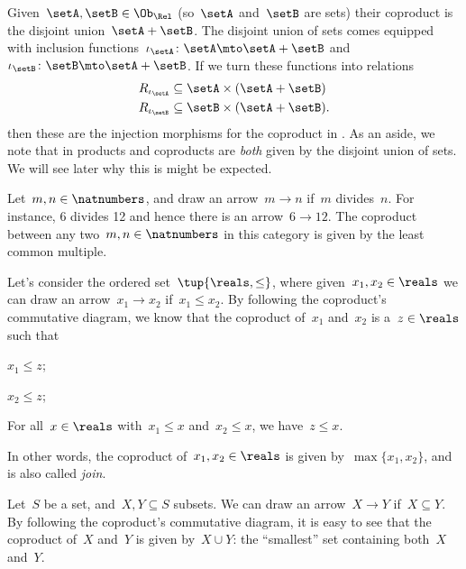 \begin{example}
  Given~$\setA,\setB\in \Ob_\Rel$ (so~$\setA$ and~$\setB$ are sets) their coproduct is the disjoint union~$\setA+\setB$.
  The disjoint union of sets comes equipped with inclusion functions~$\iota_\setA\colon \setA\mto \setA+\setB$ and~$\iota_\setB\colon \setB\mto \setA+\setB$.
  If we turn these functions into relations
  \begin{equation*}
    \begin{aligned}
      R_{\iota_\setA}&\subseteq \setA\times (\setA+\setB)\\
      R_{\iota_\setB}&\subseteq \setB\times (\setA+\setB).
    \end{aligned}
  \end{equation*}
  then these are the injection morphisms for the coproduct in \Rel.
  As an aside, we note that in \Rel products and coproducts are \emph{both} given by the disjoint union of sets.
  We will see later why this is might be expected.
\end{example}

\begin{example}
  Let~$m,n\in \natnumbers$, and draw an arrow~$m\to n$ if~$m$ divides~$n$. For instance, 6 divides 12 and hence there is an arrow~$6\to 12$. The coproduct between any two~$m,n\in \natnumbers$ in this category is given by the least common multiple.
\end{example}

\begin{example}
  Let's consider the ordered set~$\tup{\reals,\leq}$, where given~$x_1,x_2\in \reals$ we can draw an arrow~$x_1\to x_2$ if~$x_1\leq x_2$. By following the coproduct's commutative diagram, we know that the coproduct of~$x_1$ and~$x_2$ is a~$z\in \reals$ such that
  \begin{compactitem}
    \item $x_1\leq z$;
    \item $x_2\leq z$;
    \item For all~$x\in \reals$ with~$x_1\leq x$ and~$x_2\leq x$, we have~$z\leq x$.
  \end{compactitem}
  In other words, the coproduct of~$x_1,x_2\in \reals$ is given by~$\max\{x_1,x_2\}$, and is also called \emph{join}.
\end{example}

\begin{example}
  \label{ex:subset_coprod}
  Let~$S$ be a set, and~$X,Y\subseteq S$ subsets. We can draw an arrow~$X\to Y$ if~$X\subseteq Y$. By following the coproduct's commutative diagram, it is easy to see that the coproduct of~$X$ and~$Y$ is given by~$X\cup Y$: the ``smallest'' set containing both~$X$ and~$Y$.
\end{example}



